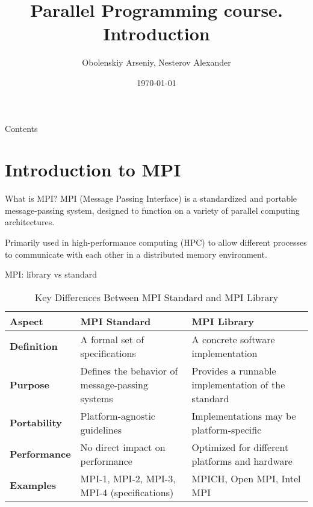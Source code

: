 \documentclass{beamer}
\title[Parallel Programming. Introduction]{Parallel Programming course. Introduction}
\author{Obolenskiy Arseniy, Nesterov Alexander}
\institute{Nizhny Novgorod State University}
\date{\today} %
\begin{document}
\begin{frame}
    \titlepage
\end{frame}

\begin{frame}{Contents}
    \tableofcontents
\end{frame}

\section{Introduction to MPI}

\begin{frame}[fragile]{What is MPI?}
  MPI (Message Passing Interface) is a standardized and portable message-passing system, designed to function on a variety of parallel computing architectures.

  Primarily used in high-performance computing (HPC) to allow different processes to communicate with each other in a distributed memory environment.
\end{frame}

\begin{frame}[fragile]{MPI: library vs standard}
  \begin{table}[h!]
    \begin{tabular}{| p{2.1cm} | p{4.2 cm} | p{4.2 cm} |}
      \hline
      \textbf{Aspect} & \textbf{MPI Standard} & \textbf{MPI Library} \\
      \hline
      \textbf{Definition} & A formal set of specifications & A concrete software implementation \\
      \hline
      \textbf{Purpose} & Defines the behavior of message-passing systems & Provides a runnable implementation of the standard \\
      \hline
      \textbf{Portability} & Platform-agnostic guidelines & Implementations may be platform-specific \\
      \hline
      \textbf{Performance} & No direct impact on performance & Optimized for different platforms and hardware \\
      \hline
      \textbf{Examples} & MPI-1, MPI-2, MPI-3, MPI-4 (specifications) & MPICH, Open MPI, Intel MPI \\
      \hline
    \end{tabular}
    \caption{Key Differences Between MPI Standard and MPI Library}
  \end{table}
\end{frame}
\end{document}
